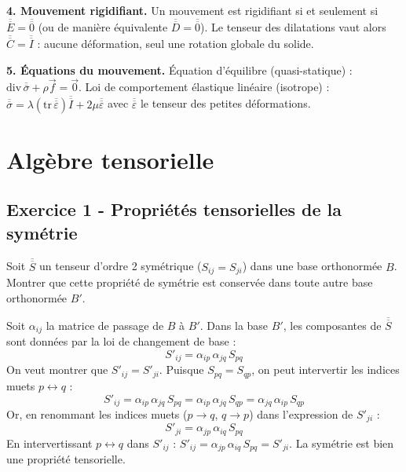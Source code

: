 \documentclass[12pt,a4paper]{article}
\begin{document}
\begin{boiteresume}
\textbf{4. Mouvement rigidifiant.} Un mouvement est rigidifiant si et seulement si $\overline{\overline{E}} = \overline{\overline{0}}$ (ou de manière équivalente $\overline{\overline{D}} = \overline{\overline{0}}$). Le tenseur des dilatations vaut alors $\overline{\overline{C}} = \overline{\overline{I}}$ : aucune déformation, seul une rotation globale du solide.

\textbf{5. Équations du mouvement.} Équation d'équilibre (quasi-statique) : $\mathrm{div}\,\overline{\overline{\sigma}} + \rho\vec{f} = \vec{0}$. Loi de comportement élastique linéaire (isotrope) : $\overline{\overline{\sigma}} = \lambda(\mathrm{tr}\,\overline{\overline{\varepsilon}})\overline{\overline{I}} + 2\mu\overline{\overline{\varepsilon}}$ avec $\overline{\overline{\varepsilon}}$ le tenseur des petites déformations.

\end{boiteresume}

\newpage
\section{Algèbre tensorielle}

\subsection*{Exercice 1 - Propriétés tensorielles de la symétrie \niveau{\facile}}

\begin{boiteexercice}
Soit $\overline{\overline{S}}$ un tenseur d'ordre 2 symétrique ($S_{ij}=S_{ji}$) dans une base orthonormée $B$. Montrer que cette propriété de symétrie est conservée dans toute autre base orthonormée $B'$.
\end{boiteexercice}

\begin{boitecorrige}
Soit $\alpha_{ij}$ la matrice de passage de $B$ à $B'$. Dans la base $B'$, les composantes de $\overline{\overline{S}}$ sont données par la loi de changement de base :
\[
S'_{ij} = \alpha_{ip}\,\alpha_{jq}\,S_{pq}
\]
On veut montrer que $S'_{ij} = S'_{ji}$. Puisque $S_{pq} = S_{qp}$, on peut intervertir les indices muets $p \leftrightarrow q$ :
\[
S'_{ij} = \alpha_{ip}\,\alpha_{jq}\,S_{pq} = \alpha_{ip}\,\alpha_{jq}\,S_{qp} = \alpha_{jq}\,\alpha_{ip}\,S_{qp}
\]
Or, en renommant les indices muets ($p \to q$, $q \to p$) dans l'expression de $S'_{ji}$ :
\[
S'_{ji} = \alpha_{jp}\,\alpha_{iq}\,S_{pq}
\]
En intervertissant $p \leftrightarrow q$ dans $S'_{ij}$ : $S'_{ij} = \alpha_{jp}\,\alpha_{iq}\,S_{pq} = S'_{ji}$. La symétrie est bien une propriété tensorielle.
\end{boitecorrige}
\end{document}
